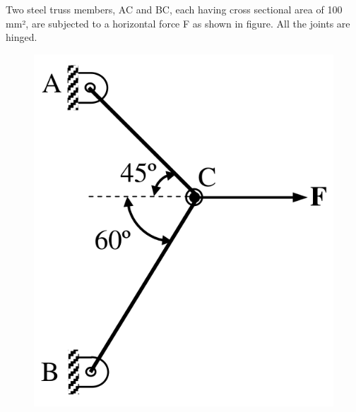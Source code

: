 \documentclass[journal,12pt,onecolumn]{IEEEtran}
\begin{document}
Two steel truss members, AC and BC, each having cross sectional area of 100 mm², are subjected to a horizontal force F as shown in figure. All the joints are hinged.

\begin{figure}[H]
    \centering
    \includegraphics[scale=0.2]{q48}
    \caption{}
    \label{q48}
\end{figure}
\end{document}

